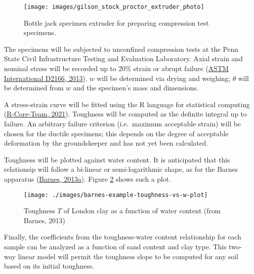 \documentclass[
  letterpaper,
  openany]{book}
\begin{document}
\begin{figure}

{\centering \texttt{[image: images/gilson\_stock\_proctor\_extruder\_photo]} 

}

\caption[Bottle jack specimen extruder]{Bottle jack specimen extruder for preparing compression test specimens.}\label{fig:proctor-extruder}
\end{figure}

The specimens will be subjected to unconfined compression tests at the Penn State Civil Infrastructure Testing and Evaluation Laboratory.
Axial strain and nominal stress will be recorded up to 20\% strain or abrupt failure (\protect\hyperlink{ref-ASTMD2166M-13}{ASTM International D2166, 2013}).
\(w\) will be determined via drying and weighing; \(\theta\) will be determined from \(w\) and the specimen's mass and dimensions.

A stress-strain curve will be fitted using the R language for statistical computing (\protect\hyperlink{ref-R-core2021}{R-Core-Team, 2021}).
Toughness will be computed as the definite integral up to failure. An arbitrary failure criterion (i.e.~maximum acceptable strain) will be chosen for the ductile specimens; this depends on the degree of acceptable deformation by the groundskeeper and has not yet been calculated.

Toughness will be plotted against water content.
It is anticipated that this relationsip will follow a bi-linear or semi-logarithmic shape, as for the Barnes apparatus (\protect\hyperlink{ref-Barnes2013}{Barnes, 2013a}).
Figure \ref{fig:barnes-toughness-vs-water-content-example-plot} shows such a plot.

\begin{figure}

{\centering \texttt{[image: ./images/barnes-example-toughness-vs-w-plot]} 

}

\caption[Example toughness vs. $w$ plot from Barnes (2013).]{Toughness $T$ of London clay as a function of water content (from Barnes, 2013)}\label{fig:barnes-toughness-vs-water-content-example-plot}
\end{figure}

Finally, the coefficients from the toughness-water content relationship for each sample can be analyzed as a function of sand content and clay type.
This two-way linear model will permit the toughness slope to be computed for any soil based on its initial toughness.
\end{document}
